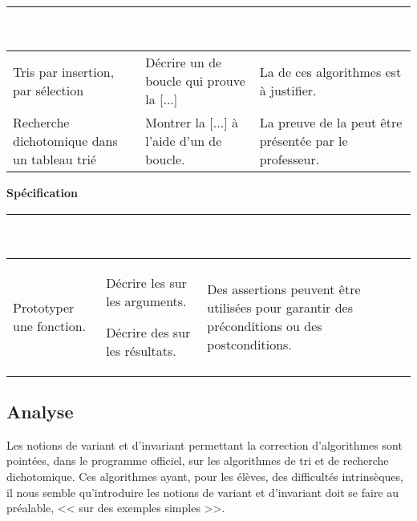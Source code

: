 \begin{center}\renewcommand{\arraystretch}{1.25}
\begin{tabular}{|L{0.2\textwidth}|L{0.35\textwidth}|L{0.35\textwidth}|}\hline
{}\bfseries\textcolor{white}{Contenus}&
\bfseries\textcolor{white}{Capacités attendues}&
\bfseries\textcolor{white}{Commentaires}\\ \hline
  Tris par insertion, par sélection
& Décrire un  de boucle qui prouve la  [...]
& La  de ces algorithmes est à justifier.\\ \hline
  Recherche dichotomique dans un tableau trié
& Montrer la  [...] à l'aide d'un  de boucle.
& La preuve de la  peut être présentée par le professeur.\\ \hline
\end{tabular}
\end{center}

{\bfseries Spécification}

\begin{center}\renewcommand{\arraystretch}{1.25}
\begin{tabular}{|L{0.2\textwidth}|L{0.35\textwidth}|L{0.35\textwidth}|}\hline
{}\bfseries\textcolor{white}{Contenus}&
\bfseries\textcolor{white}{Capacités attendues}&
\bfseries\textcolor{white}{Commentaires}\\ \hline

Prototyper une fonction. &
Décrire les  sur
les arguments.

Décrire des  sur
les résultats.&
Des assertions peuvent être
utilisées pour garantir des
préconditions ou des
postconditions.\\ \hline
\end{tabular}
\end{center}

\subsection{Analyse}

Les notions de variant et d'invariant permettant la correction d'algorithmes sont pointées, dans le programme officiel, sur les algorithmes de tri et de recherche dichotomique. Ces algorithmes ayant, pour les élèves, des difficultés intrinsèques, il nous semble qu'introduire les notions de variant et d'invariant doit se faire au préalable, << sur des exemples simples >>.

